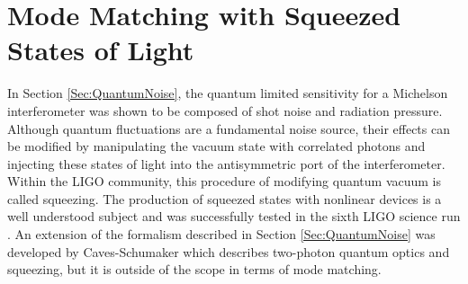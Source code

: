 	\section{Mode Matching with Squeezed States of Light}
	In Section \ref{Sec:QuantumNoise}, the quantum limited sensitivity for a Michelson interferometer was shown to be composed of shot noise and radiation pressure. Although quantum fluctuations are a fundamental noise source, their effects can be modified by manipulating the  vacuum state with correlated photons and injecting these states of light into the antisymmetric port of the interferometer.  Within the LIGO community, this procedure of modifying quantum vacuum is called squeezing.  The production of squeezed states with nonlinear devices is a well understood subject and was successfully tested in the sixth LIGO science run \cite{LSCBeyondQM}\cite{LSCEnhancedSenseSqz}.  An extension of the formalism described in Section \ref{Sec:QuantumNoise} was developed by Caves-Schumaker \cite{Caves2photon} which describes two-photon quantum optics and squeezing, but it is outside of the scope in terms of mode matching. 
	
